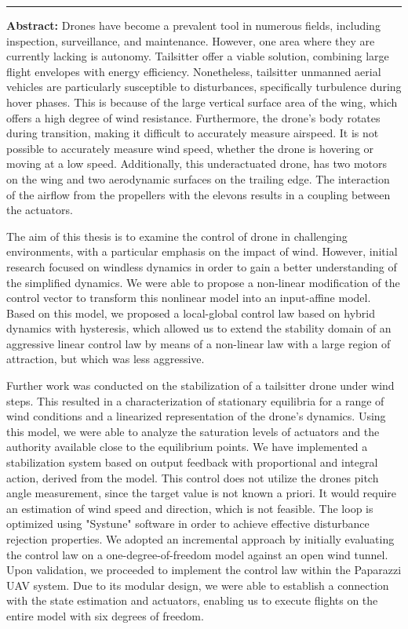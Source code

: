 \newpage
\begin{vcenterpage}
\noindent\rule[2pt]{\textwidth}{0.5pt}
{\large\textbf{Abstract:}}
Drones have become a prevalent tool in numerous fields, including inspection, surveillance, and maintenance. However, one area where they are currently lacking is autonomy. Tailsitter offer a viable solution, combining large flight envelopes with energy efficiency. Nonetheless, tailsitter unmanned aerial vehicles are particularly susceptible to disturbances, specifically turbulence during hover phases. This is because of the large vertical surface area of the wing, which offers a high degree of wind resistance. Furthermore, the drone's body rotates during transition, making it difficult to accurately measure airspeed. It is not possible to accurately measure wind speed, whether the drone is hovering or moving at a low speed. Additionally, this underactuated drone, has two motors on the wing and two aerodynamic surfaces on the trailing edge. The interaction of the airflow from the propellers with the elevons results in a coupling between the actuators.

The aim of this thesis is to examine the control of drone in challenging environments, with a particular emphasis on the impact of wind. However, initial research focused on windless dynamics in order to gain a better understanding of the simplified dynamics. We were able to propose a non-linear modification of the control vector to transform this nonlinear model into an input-affine model. Based on this model, we proposed a local-global control law based on hybrid dynamics with hysteresis, which allowed us to extend the stability domain of an aggressive linear control law by means of a non-linear law with a large region of attraction, but which was less aggressive. 

Further work was conducted on the stabilization of a tailsitter drone under wind steps. This resulted in a characterization of stationary equilibria for a range of wind conditions and a linearized representation of the drone's dynamics. Using this model, we were able to analyze the saturation levels of actuators and the authority available close to the equilibrium points. We have implemented a stabilization system based on output feedback with proportional and integral action, derived from the model. This control does not utilize the drones pitch angle measurement, since the target value is not known a priori. It would require an estimation of wind speed and direction, which is not feasible. The loop is optimized using "Systune" software in order to achieve effective disturbance rejection properties. We adopted an incremental approach by initially evaluating the control law on a one-degree-of-freedom model against an open wind tunnel. Upon validation, we proceeded to implement the control law within the Paparazzi UAV system. Due to its modular design, we were able to establish a connection with the state estimation and actuators, enabling us to execute flights on the entire model with six degrees of freedom. 


\end{vcenterpage}
